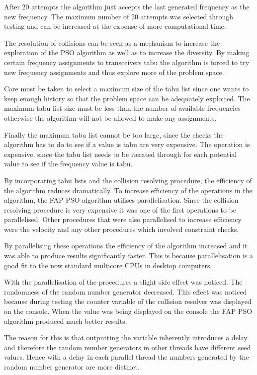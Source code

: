 After 20 attempts the algorithm just accepts the last generated frequency as the new frequency. The maximum number of 20  attempts was selected through testing and can be increased at the expense of more computational time. 

The resolution of collisions can be seen as a mechanism to increase the exploration of the \gls{PSO} algorithm as well as to increase the diversity. By making certain frequency assignments to transceivers tabu the algorithm is forced to try new frequency assignments and thus explore more of the problem space.

Care must be taken to select a maximum size of the tabu list since one wants to keep enough history so that the problem space can be adequately exploited. The maximum tabu list size must be less than the number of available frequencies otherwise the algorithm will not be allowed to make any assignments. 

Finally the maximum tabu list cannot be too large, since the checks the algorithm has to do to see if a value is tabu are very expensive. The operation is expensive, since the tabu list needs to be iterated through for each potential value to see if the frequency value is tabu.

By incorporating tabu lists and the collision resolving procedure, the efficiency of the algorithm reduces dramatically. To increase efficiency of the operations in the algorithm, the \gls{FAP} \gls{PSO} algorithm utilises parallelisation. Since the collision resolving procedure is very expensive it was one of the first operations to be parallelised. Other procedures that were also parallelised to increase efficiency were the velocity and any other procedures which involved constraint checks.

By parallelising these operations the efficiency of the algorithm increased and it was able to produce results significantly faster. This is because parallelisation is a good fit to the now standard multicore CPUs in desktop computers.

With the parallelisation of the procedures a slight side effect was noticed. The randomness of the random number generator decreased. This effect was noticed because during testing the counter variable of the collision resolver was displayed on the console. When the value was being displayed on the console the \gls{FAP} \gls{PSO} algorithm produced much better results. 

The reason for this is that outputting the variable inherently introduces a delay and therefore the random number generators in other threads have different seed values. Hence with a delay in each parallel thread the numbers generated by the random number generator are more distinct. 

